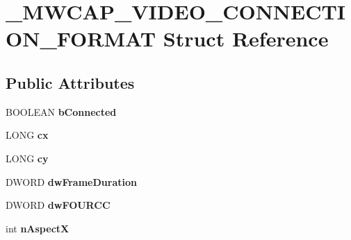 \hypertarget{struct__MWCAP__VIDEO__CONNECTION__FORMAT}{\section{\-\_\-\-M\-W\-C\-A\-P\-\_\-\-V\-I\-D\-E\-O\-\_\-\-C\-O\-N\-N\-E\-C\-T\-I\-O\-N\-\_\-\-F\-O\-R\-M\-A\-T Struct Reference}
\label{struct__MWCAP__VIDEO__CONNECTION__FORMAT}
}
\subsection*{Public Attributes}
\begin{DoxyCompactItemize}
\item 
\hypertarget{struct__MWCAP__VIDEO__CONNECTION__FORMAT_a0866442ba8c556070b6dd69506e902b7}{B\-O\-O\-L\-E\-A\-N {\bfseries b\-Connected}}\label{struct__MWCAP__VIDEO__CONNECTION__FORMAT_a0866442ba8c556070b6dd69506e902b7}

\item 
\hypertarget{struct__MWCAP__VIDEO__CONNECTION__FORMAT_a70e0a78acdde81d609a7b5f67bc82f8b}{L\-O\-N\-G {\bfseries cx}}\label{struct__MWCAP__VIDEO__CONNECTION__FORMAT_a70e0a78acdde81d609a7b5f67bc82f8b}

\item 
\hypertarget{struct__MWCAP__VIDEO__CONNECTION__FORMAT_a5a7d5a9ee5aff58ea524a01f94b4fd7f}{L\-O\-N\-G {\bfseries cy}}\label{struct__MWCAP__VIDEO__CONNECTION__FORMAT_a5a7d5a9ee5aff58ea524a01f94b4fd7f}

\item 
\hypertarget{struct__MWCAP__VIDEO__CONNECTION__FORMAT_a6e185c748340d1da5aa833a743316e6e}{D\-W\-O\-R\-D {\bfseries dw\-Frame\-Duration}}\label{struct__MWCAP__VIDEO__CONNECTION__FORMAT_a6e185c748340d1da5aa833a743316e6e}

\item 
\hypertarget{struct__MWCAP__VIDEO__CONNECTION__FORMAT_a1f4d973fc10ef09ac431dfa73fcd9f59}{D\-W\-O\-R\-D {\bfseries dw\-F\-O\-U\-R\-C\-C}}\label{struct__MWCAP__VIDEO__CONNECTION__FORMAT_a1f4d973fc10ef09ac431dfa73fcd9f59}

\item 
\hypertarget{struct__MWCAP__VIDEO__CONNECTION__FORMAT_a5d7519122a56881a47da9a361aef713a}{int {\bfseries n\-Aspect\-X}}\label{struct__MWCAP__VIDEO__CONNECTION__FORMAT_a5d7519122a56881a47da9a361aef713a}


\end{DoxyCompactItemize}
